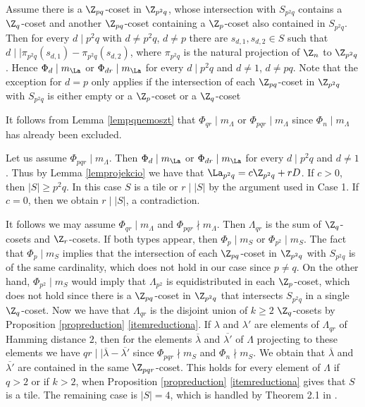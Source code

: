         Assume there  is a $\Z_{pq}$-coset in $\Z_{p^2q}$, whose intersection with $S_{p^2q}$
        contains a $\Z_q$-coset and another $\Z_{pq}$-coset containing a $\Z_p$-coset also contained in $S_{p^2q}$. 
        Then for every $d \mid p^2q$ with $d \ne p^2q$, $d \ne p$ there are $s_{d,1},s_{d,2} \in S$ such that $d \mid \mid \pi_{p^2q}(s_{d,1})-\pi_{p^2q}(s_{d,2})$, where $\pi_{p^2q}$ is the natural projection of $\Z_n$ to $\Z_{p^2q}$. Hence $\Phi_{d} \mid m_{\La}$ or $\Phi_{dr} \mid m_{\La}$ for every $ d \mid p^2q$ and $d \ne 1$, $d \ne pq$. Note that the exception for $d=p$ only applies if the intersection of each $\Z_{pq}$-coset in $\Z_{p^2q}$ with $S_{p^2q}$ is either empty or a $\Z_p$-coset or a $\Z_q$-coset 
        
        It follows from Lemma \ref{lempqnemoszt} that $\Phi_{qr} \mid m_{\Lambda}$ or $\Phi_{pqr} \mid m_{\Lambda}$ since $\Phi_{n} \mid m_{\Lambda}$ has already been excluded.   
        
        
        
        Let us assume $\Phi_{pqr} \mid m_{\Lambda}$.
        Then $\Phi_{d} \mid m_{\La}$ or $\Phi_{dr} \mid m_{\La}$ for every $ d \mid p^2q$ and $d \ne 1$. Thus by Lemma \ref{lemprojekcio} we have that $\La_{p^2q}=c\Z_{p^2q}+rD$. If $c>0$, then $|S|\ge p^2q$. In this case $S$ is a tile or $r \mid |S|$ by the argument used in Case 1.  
        If $c=0$, then we obtain $r \mid |S|$, a contradiction. 
        
        It follows we may assume $\Phi_{qr} \mid m_{\Lambda}$ and $\Phi_{pqr} \nmid m_{\Lambda}$. Then $\Lambda_{qr}$ is the sum of $\Z_q$-cosets and $\Z_r$-cosets. If both types appear, then $\Phi_p \mid m_S$ or $\Phi_{p^2} \mid m_S$. The fact that $\Phi_p \mid m_S$ implies that   the intersection of each $\Z_{pq}$-coset in $\Z_{p^2q}$ with $S_{p^2q}$ is of the same cardinality, which does not hold in our case since $p \ne q$. On the other hand, $\Phi_{p^2} \mid m_S$ would imply that $\Lambda_{p^2}$ is equidistributed in each $\Z_p$-coset, which does not hold since there is a $\Z_{pq}$-coset in $\Z_{p^2q}$ that intersects $S_{p^2q}$ in a single $\Z_q$-coset. 
        Now we have that $\Lambda_{qr}$ is the disjoint union of $k\ge 2$ $\Z_q$-cosets  by Proposition \ref{propreduction} \ref{itemreductiona}. If $\lambda$ and $\lambda'$ are elements of $\Lambda_{qr}$ of Hamming distance $2$, then for the elements $\overline{\lambda}$ and $\overline{\lambda'}$ of $\Lambda$ projecting to these elements we have $qr \mid \mid \overline{\lambda} - \overline{\lambda'}$ since $\Phi_{pqr} \nmid m_S$ and $\Phi_{n} \nmid m_S$.
    We obtain that $\overline{\lambda}$ and $\overline{\lambda'}$ are contained in the same
    $\Z_{pqr}$-coset. This holds for every element of $\Lambda$ if $q >2$ or if $k >2$,
    when Proposition \ref{propreduction} \ref{itemreductiona} gives that $S$ is a tile.
    The remaining case is $|S|=4 $, which is handled by Theorem 2.1 in
    \cite{KMkishalmaz}.
        
